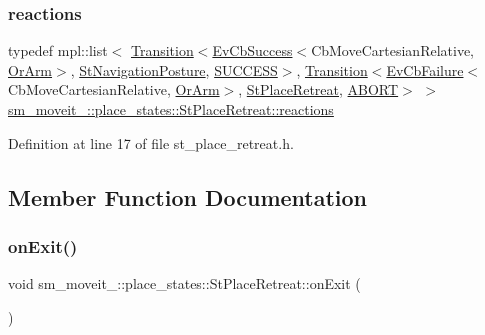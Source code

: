 \subsubsection{\texorpdfstring{reactions}{reactions}}
{\footnotesize\ttfamily typedef mpl\+::list$<$ \hyperlink{classsmacc_1_1Transition}{Transition}$<$\hyperlink{structsmacc_1_1EvCbSuccess}{Ev\+Cb\+Success}$<$Cb\+Move\+Cartesian\+Relative, \hyperlink{classsm__moveit__4_1_1OrArm}{Or\+Arm}$>$, \hyperlink{structsm__moveit__4_1_1place__states_1_1StNavigationPosture}{St\+Navigation\+Posture}, \hyperlink{structsmacc_1_1default__transition__tags_1_1SUCCESS}{S\+U\+C\+C\+E\+SS}$>$, \hyperlink{classsmacc_1_1Transition}{Transition}$<$\hyperlink{structsmacc_1_1EvCbFailure}{Ev\+Cb\+Failure}$<$Cb\+Move\+Cartesian\+Relative, \hyperlink{classsm__moveit__4_1_1OrArm}{Or\+Arm}$>$, \hyperlink{structsm__moveit__4_1_1place__states_1_1StPlaceRetreat}{St\+Place\+Retreat}, \hyperlink{structsmacc_1_1default__transition__tags_1_1ABORT}{A\+B\+O\+RT}$>$ $>$ \hyperlink{structsm__moveit__4_1_1place__states_1_1StPlaceRetreat_aa310f15b48b2227c80280277dd3b306e}{sm\+\_\+moveit\+\_\+::place\+\_\+states\+::\+St\+Place\+Retreat\+::reactions}}



Definition at line 17 of file st\+\_\+place\+\_\+retreat.\+h.



\subsection{Member Function Documentation}
\mbox{\label{structsm__moveit__4_1_1place__states_1_1StPlaceRetreat_a700f6a70e4c9836fef4b4b3e9546500d}} 
\subsubsection{\texorpdfstring{on\+Exit()}{onExit()}}
{\footnotesize\ttfamily void sm\+\_\+moveit\+\_\+::place\+\_\+states\+::\+St\+Place\+Retreat\+::on\+Exit (\begin{DoxyParamCaption}{ }\end{DoxyParamCaption})\hspace{0.3cm}{\ttfamily [inline]}}



